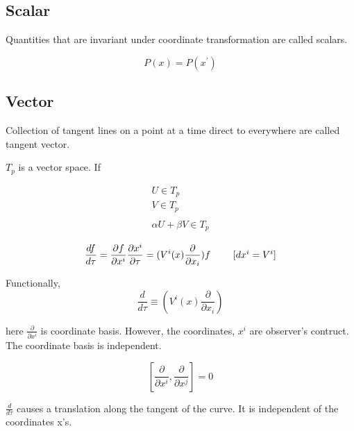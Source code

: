 \documentclass[12pt, letterpaper]{article}
\newcommand*{\1}{\hspace{1pt}}
\begin{document}
    \subsection*{Scalar}
    Quantities that are invariant under coordinate transformation are called scalars.

    \begin{equation*}
        P(x) = P(x^{'})
    \end{equation*}

    \subsection*{Vector}

    Collection of tangent lines on a point at a time direct to everywhere are called tangent vector.
    
    $T_{p}$ is a vector space. If 

    \begin{equation}
        \begin{split}
            U \in T_{p} \\
            V \in T_{p} \\ 
            \\ 
            \alpha U + \beta V \in T_{p}
        \end{split}
    \end{equation}

    \begin{align*}
        \frac{df}{d \tau} = \frac{\partial f}{\partial x^{i}} \frac{\partial x^{i}}{\partial \tau} = (V^{i}(x) \frac{\partial}{\partial x_{i}})f \tag*{ $[dx^{i} = V^{i}]$} \\   
    \end{align*}

    Functionally, 
    \begin{equation}
        \frac{d}{d \tau} \equiv 
         (V^{i}(x) \frac{\partial}{\partial x_{i}})
    \end{equation}

    here $\frac{\partial}{\partial x^{i}}$ is coordinate basis. However, the coordinates, $x^{i}$ are observer's contruct. The coordinate basis is independent. 

    \begin{equation}
        \left[ \frac{\partial}{\partial x^{i}}, \frac{\partial}{\partial x^{j}}\right] = 0 
    \end{equation}

    $\frac{d}{d \tau}$ causes a translation along the tangent of the curve. It is independent of the coordinates x's.
\end{document}
